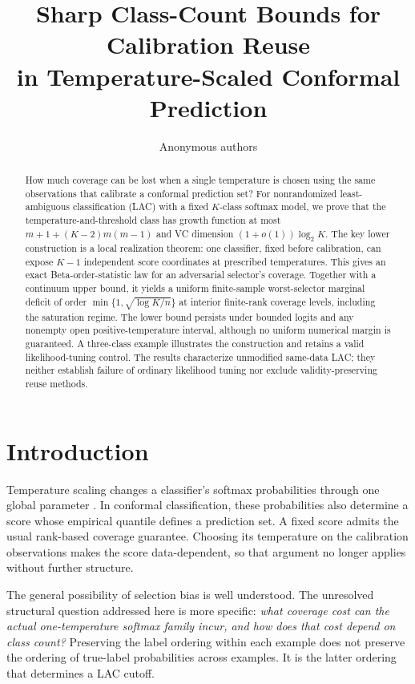 \documentclass[10pt]{article}
\title{Sharp Class-Count Bounds for Calibration Reuse\\in Temperature-Scaled Conformal Prediction}
\author{Anonymous authors}
\date{}
\theoremstyle{definition}\newtheorem{definition}[theorem]{Definition}
\theoremstyle{remark}\newtheorem{remark}[theorem]{Remark}
\newcommand{\1}{\mathbf 1}
\begin{document}
\maketitle
\begin{abstract}
How much coverage can be lost when a single temperature is chosen using the same observations that calibrate a conformal prediction set? For nonrandomized least-ambiguous classification (LAC) with a fixed $K$-class softmax model, we prove that the temperature-and-threshold class has growth function at most $m+1+(K-2)m(m-1)$ and VC dimension $(1+o(1))\log_2 K$. The key lower construction is a local realization theorem: one classifier, fixed before calibration, can expose $K-1$ independent score coordinates at prescribed temperatures. This gives an exact Beta-order-statistic law for an adversarial selector's coverage. Together with a continuum upper bound, it yields a uniform finite-sample worst-selector marginal deficit of order $\min\{1,\sqrt{\log K/n}\}$ at interior finite-rank coverage levels, including the saturation regime. The lower bound persists under bounded logits and any nonempty open positive-temperature interval, although no uniform numerical margin is guaranteed. A three-class example illustrates the construction and retains a valid likelihood-tuning control. The results characterize unmodified same-data LAC; they neither establish failure of ordinary likelihood tuning nor exclude validity-preserving reuse methods.
\end{abstract}

\section{Introduction}
Temperature scaling changes a classifier's softmax probabilities through one global parameter \citep{guo2017}. In conformal classification, these probabilities also determine a score whose empirical quantile defines a prediction set. A fixed score admits the usual rank-based coverage guarantee. Choosing its temperature on the calibration observations makes the score data-dependent, so that argument no longer applies without further structure.

The general possibility of selection bias is well understood. The unresolved structural question addressed here is more specific: \emph{what coverage cost can the actual one-temperature softmax family incur, and how does that cost depend on class count?} Preserving the label ordering within each example does not preserve the ordering of true-label probabilities across examples. It is the latter ordering that determines a LAC cutoff.
\end{document}
